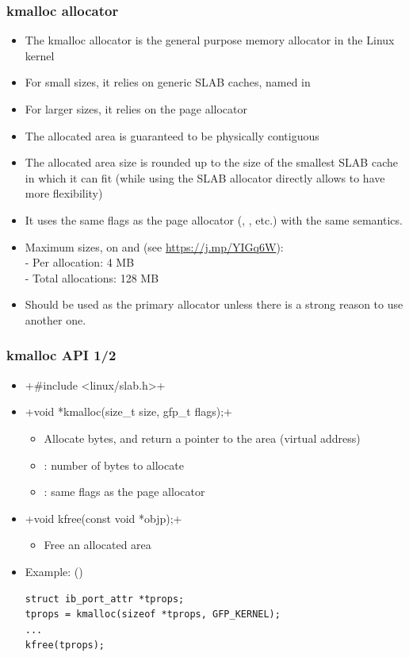 \begin{frame}
  \frametitle{kmalloc allocator}
  \begin{itemize}
  \item The kmalloc allocator is the general purpose memory allocator
    in the Linux kernel
  \item For small sizes, it relies on generic SLAB caches, named
     in 
  \item For larger sizes, it relies on the page allocator
  \item The allocated area is guaranteed to be physically contiguous
  \item The allocated area size is rounded up to the size of the
        smallest SLAB cache in which it can fit
        (while using the SLAB allocator directly allows to have more
        flexibility)
  \item It uses the same flags as the page allocator (,
    , etc.) with the same semantics.
  \item Maximum sizes, on  and  (see
    \url{https://j.mp/YIGq6W}): \\
    - Per allocation: 4 MB \\
    - Total allocations: 128 MB
  \item Should be used as the primary allocator unless there is a
    strong reason to use another one.
  \end{itemize}
\end{frame}

\begin{frame}[fragile]
  \frametitle{kmalloc API 1/2}
  \begin{itemize}
  \item {}+#include <linux/slab.h>+
  \item {}+void *kmalloc(size_t size, gfp_t flags);+
    \begin{itemize}
    \item Allocate  bytes, and return a pointer to the area
      (virtual address)
    \item {}: number of bytes to allocate
    \item {}: same flags as the page allocator
    \end{itemize}
  \item {}+void kfree(const void *objp);+
    \begin{itemize}
    \item Free an allocated area
    \end{itemize}
  \item Example: ()
\begin{verbatim}
struct ib_port_attr *tprops;
tprops = kmalloc(sizeof *tprops, GFP_KERNEL);
...
kfree(tprops);
\end{verbatim}
  \end{itemize}
\end{frame}

